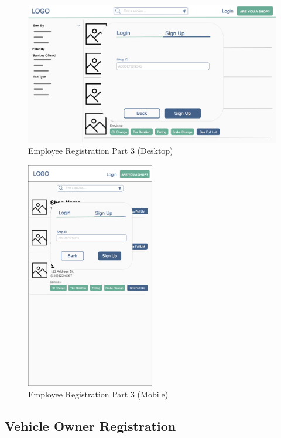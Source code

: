 \documentclass[12pt, titlepage]{article}
\begin{document}
\begin{figure}[H]
	\centering
	\includegraphics[width=\textwidth]{mockups/Employee Signup (Part 2) (Desktop).png}
	\caption{Employee Registration \textemdash{} Part 3 (Desktop)}
\end{figure}

\begin{figure}[H]
	\centering
	\includegraphics[width=0.5\textwidth]{mockups/Employee Signup (Part 2) (Mobile).png}
	\caption{Employee Registration \textemdash{} Part 3 (Mobile)}
\end{figure}

\subsection{Vehicle Owner Registration}
\end{document}
